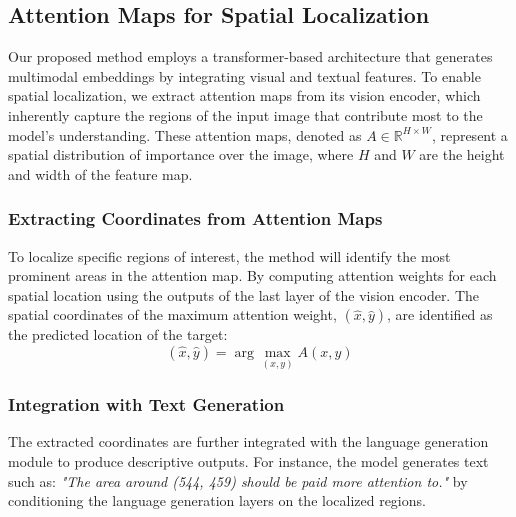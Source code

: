 \subsection{Attention Maps for Spatial Localization}

Our proposed method employs a transformer-based architecture that generates multimodal embeddings by integrating visual and textual features. To enable spatial localization, we extract attention maps from its vision encoder, which inherently capture the regions of the input image that contribute most to the model's understanding. These attention maps, denoted as \(A \in \mathbb{R}^{H \times W}\), represent a spatial distribution of importance over the image, where \(H\) and \(W\) are the height and width of the feature map.

\subsubsection{Extracting Coordinates from Attention Maps}
To localize specific regions of interest, the method will identify the most prominent areas in the attention map. By computing attention weights for each spatial location using the outputs of the last layer of the vision encoder. The spatial coordinates of the maximum attention weight, \((\hat{x}, \hat{y})\), are identified as the predicted location of the target:
    \begin{equation}
        (\hat{x}, \hat{y}) = \arg\max_{(x, y)} A(x, y)
    \end{equation}

\subsubsection{Integration with Text Generation}
The extracted coordinates are further integrated with the language generation module to produce descriptive outputs. For instance, the model generates text such as:  
\textit{"The area around (544, 459) should be paid more attention to."}  
by conditioning the language generation layers on the localized regions.




